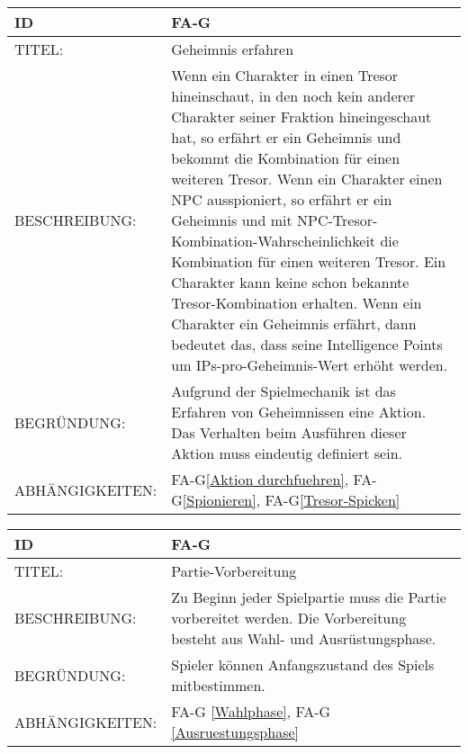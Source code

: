 \begin{tabularx}{16cm}{l|X}
	{table}\label{Geheimnis erhalten}
	\textbf{ID} & \textbf{FA-G\arabic{table}} \\
	\hline
	TITEL: & Geheimnis erfahren \\
	\hline
	BESCHREIBUNG: & Wenn ein Charakter in einen Tresor hineinschaut, in den noch kein anderer Charakter seiner Fraktion hineingeschaut hat, so erfährt er ein Geheimnis und bekommt die Kombination für einen weiteren Tresor. Wenn ein Charakter einen NPC ausspioniert, so erfährt er ein Geheimnis und mit NPC-Tresor-Kombination-Wahrscheinlichkeit die Kombination für einen weiteren Tresor. Ein Charakter kann keine schon bekannte Tresor-Kombination erhalten. Wenn ein Charakter ein Geheimnis erfährt, dann bedeutet das, dass seine Intelligence Points um IPs-pro-Geheimnis-Wert erhöht werden. \\
	 
	\hline
	BEGRÜNDUNG: & Aufgrund der Spielmechanik ist das Erfahren von Geheimnissen eine Aktion. Das Verhalten beim Ausführen dieser Aktion muss eindeutig definiert sein.\\
	\hline

	ABHÄNGIGKEITEN: & FA-G\ref{Aktion durchfuehren}, FA-G\ref{Spionieren}, FA-G\ref{Tresor-Spicken} \\
\end{tabularx}


\begin{tabularx}{16cm}{l|X}
	{table}\label{Partie-Vorbereitung}
	\textbf{ID} & \textbf{FA-G \arabic{table}} \\
	\hline
	TITEL: & Partie-Vorbereitung \\
	\hline
	BESCHREIBUNG: & Zu Beginn jeder Spielpartie muss die Partie vorbereitet werden. Die Vorbereitung besteht aus Wahl- und Ausrüstungsphase. \\
	\hline
	BEGRÜNDUNG: & Spieler können Anfangszustand des Spiels mitbestimmen. \\
	\hline
	ABHÄNGIGKEITEN: & FA-G \ref{Wahlphase}, FA-G \ref{Ausruestungsphase} \\
\end{tabularx}


